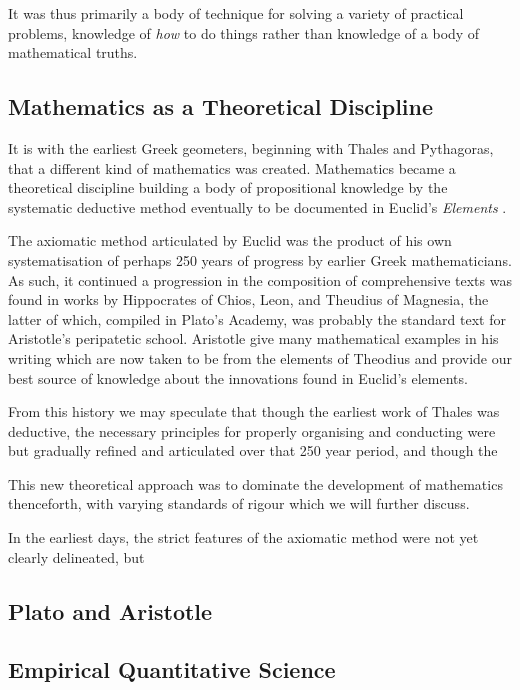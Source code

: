 \documentclass[10pt,titlepage]{book}
\begin{document}
It was thus primarily a body of technique for solving a variety of practical problems, knowledge of \emph{how} to do things rather than knowledge of a body of mathematical truths.

\subsection{Mathematics as a Theoretical Discipline}

It is with the earliest Greek geometers, beginning with Thales and Pythagoras, that a different kind of mathematics was created.
Mathematics became a theoretical discipline building a body of propositional knowledge by the systematic deductive method eventually to be documented in Euclid's \emph{Elements} \cite{euclidEL1}.

The axiomatic method articulated by Euclid was the product of his own systematisation of perhaps 250 years of progress by earlier Greek mathematicians.
As such, it continued a progression in the composition of comprehensive texts was found in works by Hippocrates of Chios, Leon, and Theudius of Magnesia, the latter of which, compiled in Plato's Academy, was probably the standard text for Aristotle's peripatetic school.
Aristotle give many mathematical examples in his writing which are now taken to be from the elements of Theodius and provide our best source of knowledge about the innovations found in Euclid's elements.

From this history we may speculate that though the earliest work of Thales was deductive, the necessary principles for properly organising and conducting were but gradually refined and articulated over that 250 year period, and though the 



This new theoretical approach was to dominate the development of mathematics thenceforth, with varying standards of rigour which we will further discuss.

In the earliest days, the strict features of the axiomatic method were not yet clearly delineated, but 

\subsection{Plato and Aristotle}

\subsection{Empirical Quantitative Science}
\end{document}
